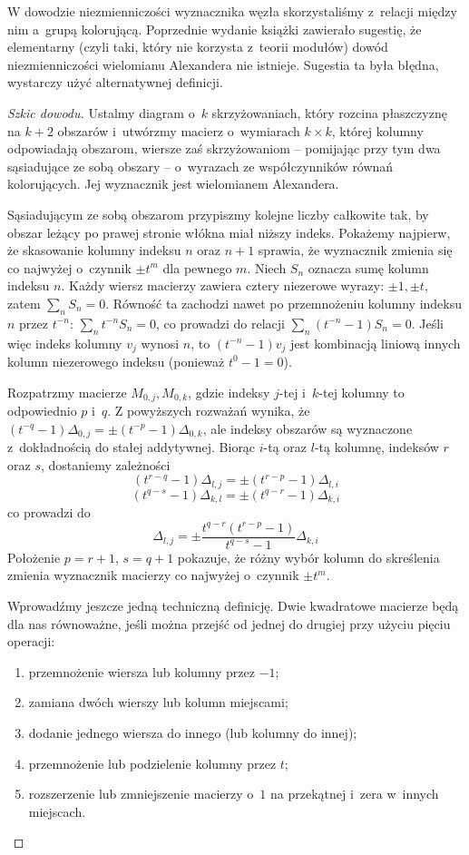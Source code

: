W dowodzie niezmienniczości wyznacznika węzła skorzystaliśmy z~relacji między nim a~grupą kolorującą.
Poprzednie wydanie książki zawierało sugestię, że elementarny (czyli taki, który nie korzysta z~teorii modułów) dowód niezmienniczości wielomianu Alexandera nie istnieje.
Sugestia ta była błędna, wystarczy użyć alternatywnej definicji.

\begin{proof}[Szkic dowodu]
	Ustalmy diagram o~$k$ skrzyżowaniach, który rozcina płaszczyznę na $k+2$ obszarów i~utwórzmy macierz o~wymiarach $k \times k$, której kolumny odpowiadają obszarom, wiersze zaś skrzyżowaniom -- pomijając przy tym dwa sąsiadujące ze sobą obszary -- o~wyrazach ze współczynników równań kolorujących.
	Jej wyznacznik jest wielomianem Alexandera.

	Sąsiadującym ze sobą obszarom przypiszmy kolejne liczby całkowite tak, by obszar leżący po prawej stronie włókna miał niższy indeks.
	Pokażemy najpierw, że skasowanie kolumny indeksu $n$ oraz $n+1$ sprawia, że wyznacznik zmienia się co najwyżej o~czynnik $\pm t^m$ dla pewnego $m$.
	Niech $S_n$ oznacza sumę kolumn indeksu $n$.
	Każdy wiersz macierzy zawiera cztery niezerowe wyrazy: $\pm 1, \pm t$, zatem $\sum_n S_n = 0$.
	Równość ta zachodzi nawet po przemnożeniu kolumny indeksu $n$ przez $t^{-n}$: $\sum_n t^{-n}S_n = 0$, co prowadzi do relacji $\sum_n (t^{-n}-1) S_n = 0$.
	Jeśli więc indeks kolumny $v_j$ wynosi $n$, to $(t^{-n}-1)v_j$ jest kombinacją liniową innych kolumn niezerowego indeksu (ponieważ $t^0 - 1 = 0$).

	Rozpatrzmy macierze $M_{0,j}, M_{0,k}$, gdzie indeksy $j$-tej i~$k$-tej kolumny to odpowiednio $p$ i~$q$.
	Z powyższych rozważań wynika, że $(t^{-q}-1) \Delta_{0,j} = \pm (t^{-p}-1)\Delta_{0,k}$, ale indeksy obszarów są wyznaczone z~dokładnością do stałej addytywnej.
	Biorąc $i$-tą oraz $l$-tą kolumnę, indeksów $r$ oraz $s$, dostaniemy zależności
	$$(t^{r-q}-1) \Delta_{l,j} = \pm (t^{r-p} - 1)\Delta_{l,i}$$
	$$(t^{q-s}-1) \Delta_{k,l} = \pm (t^{q-r} - 1)\Delta_{k,i}$$
	co prowadzi do
	$$\Delta_{l,j} = \pm \frac{t^{q-r}(t^{r-p}-1)}{t^{q-s}-1} \Delta_{k,i}$$
	Położenie $p = r +1$, $s =q+1$ pokazuje, że różny wybór kolumn do skreślenia zmienia wyznacznik macierzy co najwyżej o~czynnik $\pm t^m$.

	Wprowadźmy jeszcze jedną techniczną definicję.
	Dwie kwadratowe macierze będą dla nas równoważne, jeśli można przejść od jednej do drugiej przy użyciu pięciu operacji:
	\begin{enumerate}[leftmargin=*]
	\itemsep0em
		\item przemnożenie wiersza lub kolumny przez $-1$;
		\item zamiana dwóch wierszy lub kolumn miejscami;
		\item dodanie jednego wiersza do innego (lub kolumny do innej);
		\item przemnożenie lub podzielenie kolumny przez $t$;
		\item rozszerzenie lub zmniejszenie macierzy o~$1$ na przekątnej i~zera w~innych miejscach.
	\end{enumerate}


\end{proof}
